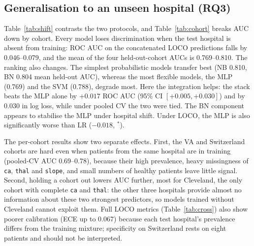 \documentclass[conference]{IEEEtran}
\newcommand{\code}[1]{\texttt{\small #1}}
\begin{document}
\begin{table}[t]
\caption{Paired bootstrap differences in ROC AUC (2{,}000 resamples). $^{*}$ = 95\% interval excludes zero}
\label{tab:paired}
\centering
\scriptsize
\setlength{\tabcolsep}{3pt}

\end{table}

\subsection{Generalisation to an unseen hospital (RQ3)}
Table~\ref{tab:shift} contrasts the two protocols, and Table~\ref{tab:cohort} breaks AUC down by cohort. Every model loses discrimination when the test hospital is absent from training: ROC AUC on the concatenated LOCO predictions falls by 0.046--0.079, and the mean of the four held-out-cohort AUCs is 0.769--0.810. The ranking also changes. The simplest probabilistic models transfer best (NB 0.810, BN 0.804 mean held-out AUC), whereas the most flexible models, the MLP (0.769) and the SVM (0.788), degrade most. Here the integration helps: the stack beats the MLP alone by $+0.017$ ROC AUC (95\% CI $[+0.005,+0.030]$) and by 0.030 in log loss, while under pooled CV the two were tied. The BN component appears to stabilise the MLP under hospital shift. Under LOCO, the MLP is also significantly worse than LR ($-0.018$, $^{*}$).

\begin{table}[t]
\caption{ROC AUC under pooled CV vs.\ leave-one-cohort-out}
\label{tab:shift}
\centering
\scriptsize
\setlength{\tabcolsep}{3pt}

\end{table}

\begin{table}[t]
\caption{ROC AUC by cohort. Left: pooled nested CV predictions split by cohort. Right: each cohort held out entirely (LOCO).}
\label{tab:cohort}
\centering
\footnotesize

\end{table}

The per-cohort results show two separate effects. First, the VA and Switzerland cohorts are hard even when patients from the same hospital are in training (pooled-CV AUC 0.69--0.78), because their high prevalence, heavy missingness of \code{ca}, \code{thal} and \code{slope}, and small numbers of healthy patients leave little signal. Second, holding a cohort out lowers AUC further, most for Cleveland, the only cohort with complete \code{ca} and \code{thal}: the other three hospitals provide almost no information about these two strongest predictors, so models trained without Cleveland cannot exploit them. Full LOCO metrics (Table~\ref{tab:cross}) also show poorer calibration (ECE up to 0.067) because each test hospital's prevalence differs from the training mixture; specificity on Switzerland rests on eight patients and should not be interpreted.
\end{document}
